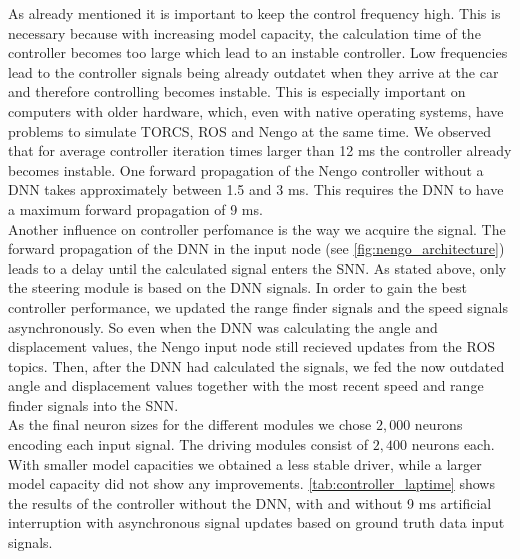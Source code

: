 \documentclass[10pt,a4paper,twoside,journal]{IEEEtran}
\begin{document}
%
%
As already mentioned it is important to keep the control frequency high. This is necessary because with increasing model capacity, the calculation time of the controller becomes too large which lead to an instable controller. Low frequencies lead to the controller signals being already outdatet when they arrive at the car and therefore controlling becomes instable. This is especially important on computers with older hardware, which, even with native operating systems, have problems to simulate TORCS, ROS and Nengo at the same time. We observed that for average controller iteration times larger than 12 ms the controller already becomes instable. One forward propagation of the Nengo controller without a DNN takes approximately between 1.5 and 3 ms. This requires the DNN to have a maximum forward propagation of 9 ms. \\
Another influence on controller perfomance is the way we acquire the signal. The forward propagation of the DNN in the input node (see \autoref{fig:nengo_architecture}) leads to a delay until the calculated signal enters the SNN. As stated above, only the steering module is based on the DNN signals. In order to gain the best controller performance, we updated the range finder signals and the speed signals asynchronously. So even when the DNN was calculating the angle and displacement values, the Nengo input node still recieved updates from the ROS topics. Then, after the DNN had calculated the signals, we fed the now outdated angle and displacement values together with the most recent speed and range finder signals into the SNN. \\
As the final neuron sizes for the different modules we chose $2,000$ neurons encoding each input signal. The driving modules consist of $2,400$ neurons each. With smaller model capacities we obtained a less stable driver, while a larger model capacity did not show any improvements. \autoref{tab:controller_laptime} shows the results of the controller without the DNN, with and without 9 ms artificial interruption with asynchronous signal updates based on ground truth data input signals.
\end{document}
